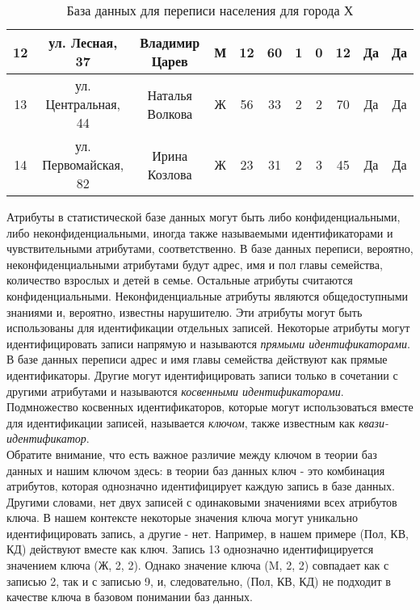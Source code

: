 \begin{table}[h]
\begin{tabular}{|c|c|c|c|c|c|c|c|c|c|c|}
12 & ул. Лесная, 37       & Владимир Царев    & М      & 12       & 60         & 1                   & 0                & 12          & Да              & Да                    \\ \hline
13 & ул. Центральная, 44  & Наталья Волкова    & Ж      & 56       & 33         & 2                   & 2                & 70          & Да              & Да                    \\ \hline
14 & ул. Первомайская, 82 & Ирина Козлова      & Ж      & 23       & 31         & 2                   & 3                & 45          & Да              & Да                    \\ \hline
\end{tabular}
\caption{База данных для переписи населения для города Х}
\label{tab:main}
\end{table}

Атрибуты в статистической базе данных могут быть либо конфиденциальными, либо неконфиденциальными, иногда также называемыми идентификаторами и чувствительными атрибутами, соответственно. В базе данных переписи, вероятно, неконфиденциальными атрибутами будут адрес, имя и пол главы семейства, количество взрослых и детей в семье. Остальные атрибуты считаются конфиденциальными. Неконфиденциальные атрибуты являются общедоступными знаниями и, вероятно, известны нарушителю. Эти атрибуты могут быть использованы для идентификации отдельных записей. Некоторые атрибуты могут идентифицировать записи напрямую и называются \textit{прямыми идентификаторами}. В базе данных переписи адрес и имя главы семейства действуют как прямые идентификаторы. Другие могут идентифицировать записи только в сочетании с другими атрибутами и называются \textit{косвенными идентификаторами}. Подмножество косвенных идентификаторов, которые могут использоваться вместе для идентификации записей, называется \textit{ключом}, также известным как \textit{квази-идентификатор}. 
\\

Обратите внимание, что есть важное различие между ключом в теории баз данных и нашим ключом здесь: в теории баз данных ключ - это комбинация атрибутов, которая однозначно идентифицирует каждую запись в базе данных. Другими словами, нет двух записей с одинаковыми значениями всех атрибутов ключа. В нашем контексте некоторые значения ключа могут уникально идентифицировать запись, а другие - нет. Например, в нашем примере (Пол, КВ, КД) действуют вместе как ключ. Запись 13 однозначно идентифицируется значением ключа (Ж, 2, 2). Однако значение ключа (M, 2, 2) совпадает как с записью 2, так и с записью 9, и, следовательно, (Пол, КВ, КД) не подходит в качестве ключа в базовом понимании баз данных. 
\\

